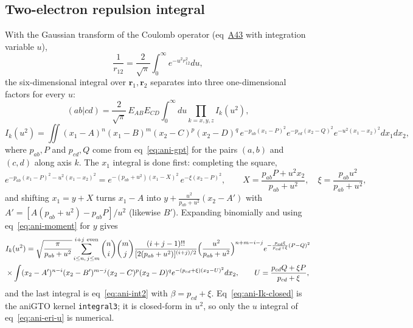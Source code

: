 \documentclass[journal=jctcce,manuscript=suppinfo]{achemso}
\begin{document}
\subsection{Two-electron repulsion integral}
With the Gaussian transform of the Coulomb operator (eq~\href{main.pdf\#equation.43}{A43}
with integration variable $u$),
\begin{equation}
\frac{1}{r_{12}}=\frac{2}{\sqrt\pi}\int_0^\infty e^{-u^2r_{12}^2}du,
\label{eq:ani-coulomb}
\end{equation}
the six-dimensional integral over $\mathbf r_1,\mathbf r_2$ separates into
three one-dimensional factors for every $u$:
\begin{equation}
(ab|cd)=\frac{2}{\sqrt\pi}\,E_{AB}E_{CD}\int_0^\infty du\prod_{k=x,y,z}I_k(u^2),
\label{eq:ani-eri-u}
\end{equation}
\begin{equation}
I_k(u^2)=\iint(x_1-A)^{n}(x_1-B)^{m}(x_2-C)^{p}(x_2-D)^{q}\,
e^{-p_{ab}(x_1-P)^2}e^{-p_{cd}(x_2-Q)^2}e^{-u^2(x_1-x_2)^2}dx_1dx_2,
\label{eq:ani-Ik}
\end{equation}
where $p_{ab},P$ and $p_{cd},Q$ come from eq~\ref{eq:ani-gpt} for the pairs
$(a,b)$ and $(c,d)$ along axis $k$.  The $x_1$ integral is done first:
completing the square,
\begin{equation}
e^{-p_{ab}(x_1-P)^2-u^2(x_1-x_2)^2}=e^{-(p_{ab}+u^2)(x_1-X)^2}\,e^{-\xi(x_2-P)^2},\qquad
X=\frac{p_{ab}P+u^2x_2}{p_{ab}+u^2},\quad \xi=\frac{p_{ab}u^2}{p_{ab}+u^2},
\label{eq:ani-x1}
\end{equation}
and shifting $x_1=y+X$ turns $x_1-A$ into
$y+\frac{u^2}{p_{ab}+u^2}(x_2-A')$ with
$A'=[A(p_{ab}+u^2)-p_{ab}P]/u^2$ (likewise $B'$).  Expanding binomially and
using eq~\ref{eq:ani-moment} for $y$ gives
\begin{multline}
I_k(u^2)=\sqrt{\frac{\pi}{p_{ab}+u^2}}\sum_{i\le n,\,j\le m}^{i+j\ \mathrm{even}}
\binom{n}{i}\binom{m}{j}\frac{(i+j-1)!!}{[2(p_{ab}+u^2)]^{(i+j)/2}}
\Bigl(\frac{u^2}{p_{ab}+u^2}\Bigr)^{n+m-i-j}
e^{-\frac{p_{cd}\xi}{p_{cd}+\xi}(P-Q)^2}\\
\times\int(x_2-A')^{n-i}(x_2-B')^{m-j}(x_2-C)^{p}(x_2-D)^{q}
e^{-(p_{cd}+\xi)(x_2-U)^2}dx_2,
\qquad U=\frac{p_{cd}Q+\xi P}{p_{cd}+\xi},
\label{eq:ani-Ik-closed}
\end{multline}
and the last integral is eq~\ref{eq:ani-int2} with $\beta=p_{cd}+\xi$.
Eq~\ref{eq:ani-Ik-closed} is the aniGTO kernel \texttt{integral3}; it is
closed-form in $u^2$, so only the $u$ integral of eq~\ref{eq:ani-eri-u} is
numerical.
\end{document}
